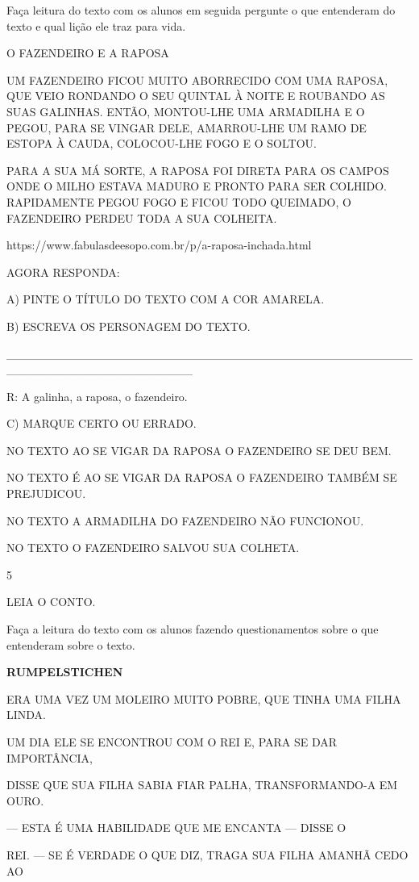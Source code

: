{{Faça leitura do texto com os alunos em seguida pergunte o que entenderam
do texto e qual lição ele traz para vida.

O FAZENDEIRO E A RAPOSA

UM FAZENDEIRO FICOU MUITO ABORRECIDO COM UMA RAPOSA, QUE VEIO RONDANDO O
SEU QUINTAL À NOITE E ROUBANDO AS SUAS GALINHAS. ENTÃO, MONTOU-LHE UMA
ARMADILHA E O PEGOU, PARA SE VINGAR DELE, AMARROU-LHE UM RAMO DE ESTOPA
À CAUDA, COLOCOU-LHE FOGO E O SOLTOU.

PARA A SUA MÁ SORTE, A RAPOSA FOI DIRETA PARA OS CAMPOS ONDE O MILHO
ESTAVA MADURO E PRONTO PARA SER COLHIDO. RAPIDAMENTE PEGOU FOGO E FICOU
TODO QUEIMADO, O FAZENDEIRO PERDEU TODA A SUA COLHEITA.

https://www.fabulasdeesopo.com.br/p/a-raposa-inchada.html

AGORA RESPONDA:

A) PINTE O TÍTULO DO TEXTO COM A COR AMARELA.

B) ESCREVA OS PERSONAGEM DO TEXTO.

\_\_\_\_\_\_\_\_\_\_\_\_\_\_\_\_\_\_\_\_\_\_\_\_\_\_\_\_\_\_\_\_\_\_\_\_\_\_\_\_\_\_\_\_\_\_\_\_\_\_\_\_\_\_\_\_\_\_\_\_\_\_\_\_\_\_\_\_\_\_

R: A galinha, a raposa, o fazendeiro.

C) MARQUE CERTO OU ERRADO.

NO TEXTO AO SE VIGAR DA RAPOSA O FAZENDEIRO SE DEU BEM.

NO TEXTO É AO SE VIGAR DA RAPOSA O FAZENDEIRO TAMBÉM SE PREJUDICOU.

NO TEXTO A ARMADILHA DO FAZENDEIRO NÃO FUNCIONOU.

NO TEXTO O FAZENDEIRO SALVOU SUA COLHETA.

\num{5}

LEIA O CONTO.

Faça a leitura do texto com os alunos fazendo questionamentos sobre o
que entenderam sobre o texto.

\textbf{RUMPELSTICHEN}

ERA UMA VEZ UM MOLEIRO MUITO POBRE, QUE TINHA UMA FILHA LINDA.

UM DIA ELE SE ENCONTROU COM O REI E, PARA SE DAR IMPORTÂNCIA,

DISSE QUE SUA FILHA SABIA FIAR PALHA, TRANSFORMANDO-A EM OURO.

--- ESTA É UMA HABILIDADE QUE ME ENCANTA --- DISSE O

REI. --- SE É VERDADE O QUE DIZ, TRAGA SUA FILHA AMANHÃ CEDO AO

}}
